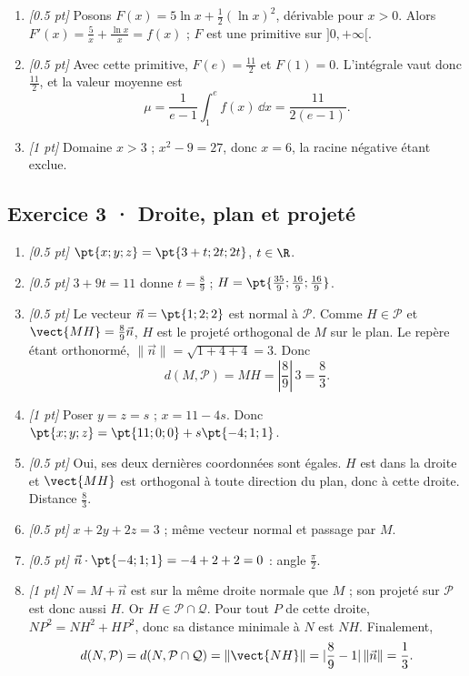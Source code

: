 \begin{enumerate}
\item \textit{[\num{0,5} pt]} Posons $F(x)=5\ln x+\frac12(\ln x)^2$, dérivable pour $x>0$. Alors $F'(x)=\frac{5}{x}+\frac{\ln x}{x}=f(x)$ ; $F$ est une primitive sur $]0,+\infty[$.

\item \textit{[\num{0,5} pt]} Avec cette primitive, $F(e)=\frac{11}{2}$ et $F(1)=0$. L'intégrale vaut donc $\frac{11}{2}$, et la valeur moyenne est
\[\mu=\frac{1}{e-1}\int_1^e f(x)\,\dd x=\frac{11}{2(e-1)}.\]

\item \textit{[1 pt]} Domaine $x>3$ ; $x^2-9=27$, donc $x=6$, la racine négative étant exclue.

\end{enumerate}

\subsection*{Exercice 3 · Droite, plan et projeté}\begin{enumerate}

\item \textit{[\num{0,5} pt]} $\pt{x;y;z}=\pt{3+t;2t;2t}$, $t\in\R$.

\item \textit{[\num{0,5} pt]} $3+9t=11$ donne $t=\frac{8}{9}$ ; $H=\pt{\frac{35}{9};\frac{16}{9};\frac{16}{9}}$.

\item \textit{[\num{0,5} pt]} Le vecteur $\vec n=\pt{1;2;2}$ est normal à $\mathcal P$. Comme $H\in\mathcal P$ et $\vect{MH}=\frac{8}{9}\vec n$, $H$ est le projeté orthogonal de $M$ sur le plan. Le repère étant orthonormé, $\|\vec n\|=\sqrt{1+4+4}=3$. Donc
\[d(M,\mathcal P)=MH=|\frac{8}{9}|\,3=\frac{8}{3}.\]

\item \textit{[1 pt]} Poser $y=z=s$ ; $x=11-4s$. Donc $\pt{x;y;z}=\pt{11;0;0}+s\pt{-4;1;1}$.

\item \textit{[\num{0,5} pt]} Oui, ses deux dernières coordonnées sont égales. $H$ est dans la droite et $\vect{MH}$ est orthogonal à toute direction du plan, donc à cette droite. Distance $\frac{8}{3}$.

\item \textit{[\num{0,5} pt]} $x+2y+2z=3$ ; même vecteur normal et passage par $M$.

\item \textit{[\num{0,5} pt]} $\vec n\cdot\pt{-4;1;1}=-4+2+2=0$ : angle $\frac{\pi}{2}$.

\item \textit{[1 pt]} $N=M+\vec n$ est sur la même droite normale que $M$ ; son projeté sur $\mathcal P$ est donc aussi $H$. Or $H\in\mathcal P\cap\mathcal Q$. Pour tout $P$ de cette droite, $NP^2=NH^2+HP^2$, donc sa distance minimale à $N$ est $NH$. Finalement,
\[d(N,\mathcal P)=d(N,\mathcal P\cap\mathcal Q)=\|\vect{NH}\|=|\frac{8}{9}-1|\,\|\vec n\|=\frac{1}{3}.\]

\end{enumerate}

